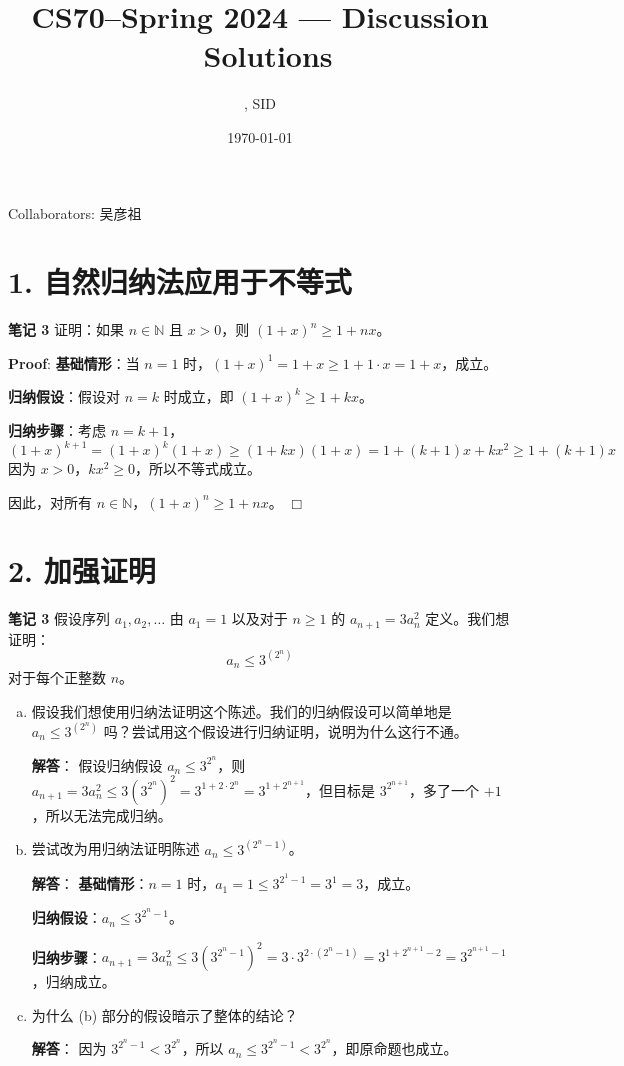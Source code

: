 \documentclass[11pt]{article}
\title{CS70--Spring 2024 --- Discussion \Homework \  Solutions}
\author{\Name, SID \SID}
\date{\today}
\def\endproofmark{$\Box$}
\newenvironment{proof}{\par{\bf Proof}:}{\endproofmark\smallskip}
\begin{document}
\maketitle

Collaborators: 吴彦祖

\section*{1. 自然归纳法应用于不等式}
\textbf{笔记 3} 证明：如果 $n \in \mathbb{N}$ 且 $x > 0$，则 $(1 + x)^n \geq 1 + n x$。

\begin{proof}
\textbf{基础情形}：当 $n=1$ 时，$(1+x)^1 = 1+x \geq 1+1\cdot x = 1+x$，成立。

\textbf{归纳假设}：假设对 $n=k$ 时成立，即 $(1+x)^k \geq 1+kx$。

\textbf{归纳步骤}：考虑 $n=k+1$，
$$(1+x)^{k+1} = (1+x)^k (1+x) \geq (1+kx)(1+x) = 1 + (k+1)x + kx^2 \geq 1 + (k+1)x$$
因为 $x>0$，$kx^2 \geq 0$，所以不等式成立。

因此，对所有 $n \in \mathbb{N}$，$(1+x)^n \geq 1+nx$。
\end{proof}

\section*{2. 加强证明}
\textbf{笔记 3} 假设序列 $a_1, a_2, \ldots$ 由 $a_1 = 1$ 以及对于 $n \geq 1$ 的 $a_{n+1} = 3 a_n^2$ 定义。我们想证明：
\[
a_n \leq 3^{\left(2^n\right)}
\]
对于每个正整数 $n$。

\begin{enumerate}[(a)]
\item 假设我们想使用归纳法证明这个陈述。我们的归纳假设可以简单地是 $a_n \leq 3^{\left(2^n\right)}$ 吗？尝试用这个假设进行归纳证明，说明为什么这行不通。

\textbf{解答}：
假设归纳假设 $a_n \leq 3^{2^n}$，则 $a_{n+1} = 3 a_n^2 \leq 3 (3^{2^n})^2 = 3^{1+2\cdot 2^n} = 3^{1+2^{n+1}}$，但目标是 $3^{2^{n+1}}$，多了一个 $+1$，所以无法完成归纳。

\item 尝试改为用归纳法证明陈述 $a_n \leq 3^{\left(2^n - 1\right)}$。

\textbf{解答}：
\textbf{基础情形}：$n=1$ 时，$a_1=1 \leq 3^{2^1-1}=3^1=3$，成立。

\textbf{归纳假设}：$a_n \leq 3^{2^n-1}$。

\textbf{归纳步骤}：$a_{n+1} = 3 a_n^2 \leq 3 (3^{2^n-1})^2 = 3 \cdot 3^{2\cdot(2^n-1)} = 3^{1+2^{n+1}-2} = 3^{2^{n+1}-1}$，归纳成立。

\item 为什么 (b) 部分的假设暗示了整体的结论？

\textbf{解答}：
因为 $3^{2^n-1} < 3^{2^n}$，所以 $a_n \leq 3^{2^n-1} < 3^{2^n}$，即原命题也成立。
\end{enumerate}
\end{document}
